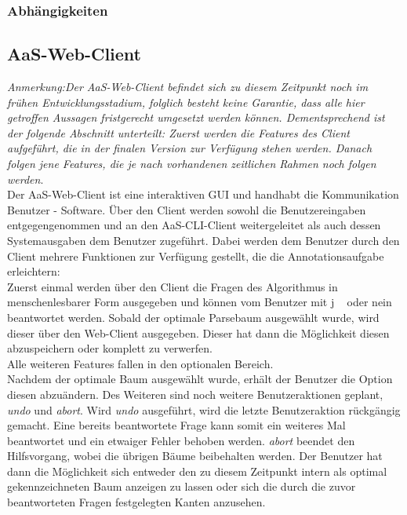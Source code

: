 \documentclass{scrartcl}
\begin{document}
\subsubsection{Abhängigkeiten}
\label{ssub:CLI-Client-Abhaengigkeiten}

\subsection{AaS-Web-Client}
\label{sub:AaS-Web-Client}
\textit{Anmerkung:Der AaS-Web-Client befindet sich zu diesem Zeitpunkt noch im frühen Entwicklungsstadium, folglich besteht keine Garantie, dass alle hier getroffen Aussagen fristgerecht umgesetzt werden können. Dementsprechend ist der folgende Abschnitt unterteilt: Zuerst werden die Features des Client aufgeführt, die in der finalen Version zur Verfügung stehen werden. Danach folgen jene Features, die je nach vorhandenen zeitlichen Rahmen noch folgen werden}.\\
Der AaS-Web-Client ist eine interaktiven GUI und handhabt die Kommunikation Benutzer - Software. Über den Client werden sowohl die Benutzereingaben entgegengenommen und an den AaS-CLI-Client weitergeleitet als auch dessen Systemausgaben dem Benutzer zugeführt.
Dabei werden dem Benutzer durch den Client mehrere Funktionen zur Verfügung gestellt, die die Annotationsaufgabe erleichtern:\\
Zuerst einmal werden über den Client die Fragen des Algorithmus in menschenlesbarer Form ausgegeben und können vom Benutzer mit \glqq j \grqq~ oder \glqq nein\grqq~ beantwortet werden. Sobald der optimale Parsebaum ausgewählt wurde, wird dieser über den Web-Client ausgegeben. Dieser hat dann die Möglichkeit diesen abzuspeichern oder komplett zu verwerfen.\\
Alle weiteren Features fallen in den optionalen Bereich.\\
Nachdem der optimale Baum ausgewählt wurde, erhält der Benutzer die Option diesen abzuändern.
Des Weiteren sind noch weitere Benutzeraktionen geplant,  \textit{undo} und \textit{abort}. Wird \textit{undo} ausgeführt, wird die letzte Benutzeraktion rückgängig gemacht. Eine bereits beantwortete Frage kann somit ein weiteres Mal beantwortet und ein etwaiger Fehler behoben werden. \textit{abort} beendet den Hilfsvorgang, wobei die übrigen Bäume beibehalten werden. Der Benutzer hat dann die Möglichkeit sich entweder den zu diesem Zeitpunkt intern als optimal gekennzeichneten Baum anzeigen zu lassen oder sich die durch die zuvor beantworteten Fragen festgelegten Kanten anzusehen.
\end{document}
